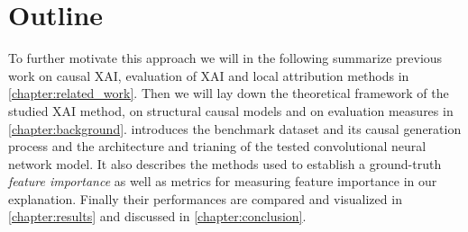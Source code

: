 \section{Outline}
To further motivate this approach we will in the following summarize previous work on causal XAI, evaluation of XAI and local attribution methods in \cref{chapter:related_work}. Then we will lay down the theoretical framework of the studied XAI method, on structural causal models and on evaluation measures in \cref{chapter:background}.  introduces the benchmark dataset and its causal generation process and the architecture and trianing of the tested convolutional neural network model. It also describes the methods used to establish a ground-truth \textit{feature importance} as well as metrics for measuring feature importance in our explanation. Finally their performances are compared and visualized in \cref{chapter:results} and discussed in \cref{chapter:conclusion}.
